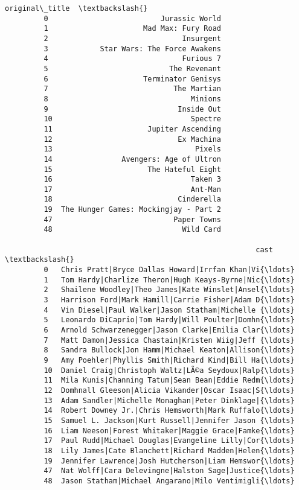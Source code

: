 \documentclass[11pt]{article}
\begin{document}
\begin{Verbatim}[commandchars=\\\{\}]
                                    original\_title  \textbackslash{}
         0                          Jurassic World   
         1                      Mad Max: Fury Road   
         2                               Insurgent   
         3            Star Wars: The Force Awakens   
         4                               Furious 7   
         5                            The Revenant   
         6                      Terminator Genisys   
         7                             The Martian   
         8                                 Minions   
         9                              Inside Out   
         10                                Spectre   
         11                      Jupiter Ascending   
         12                             Ex Machina   
         13                                 Pixels   
         14                Avengers: Age of Ultron   
         15                      The Hateful Eight   
         16                                Taken 3   
         17                                Ant-Man   
         18                             Cinderella   
         19  The Hunger Games: Mockingjay - Part 2   
         47                            Paper Towns   
         48                              Wild Card   
         
                                                          cast  \textbackslash{}
         0   Chris Pratt|Bryce Dallas Howard|Irrfan Khan|Vi{\ldots}   
         1   Tom Hardy|Charlize Theron|Hugh Keays-Byrne|Nic{\ldots}   
         2   Shailene Woodley|Theo James|Kate Winslet|Ansel{\ldots}   
         3   Harrison Ford|Mark Hamill|Carrie Fisher|Adam D{\ldots}   
         4   Vin Diesel|Paul Walker|Jason Statham|Michelle {\ldots}   
         5   Leonardo DiCaprio|Tom Hardy|Will Poulter|Domhn{\ldots}   
         6   Arnold Schwarzenegger|Jason Clarke|Emilia Clar{\ldots}   
         7   Matt Damon|Jessica Chastain|Kristen Wiig|Jeff {\ldots}   
         8   Sandra Bullock|Jon Hamm|Michael Keaton|Allison{\ldots}   
         9   Amy Poehler|Phyllis Smith|Richard Kind|Bill Ha{\ldots}   
         10  Daniel Craig|Christoph Waltz|LÃ©a Seydoux|Ralp{\ldots}   
         11  Mila Kunis|Channing Tatum|Sean Bean|Eddie Redm{\ldots}   
         12  Domhnall Gleeson|Alicia Vikander|Oscar Isaac|S{\ldots}   
         13  Adam Sandler|Michelle Monaghan|Peter Dinklage|{\ldots}   
         14  Robert Downey Jr.|Chris Hemsworth|Mark Ruffalo{\ldots}   
         15  Samuel L. Jackson|Kurt Russell|Jennifer Jason {\ldots}   
         16  Liam Neeson|Forest Whitaker|Maggie Grace|Famke{\ldots}   
         17  Paul Rudd|Michael Douglas|Evangeline Lilly|Cor{\ldots}   
         18  Lily James|Cate Blanchett|Richard Madden|Helen{\ldots}   
         19  Jennifer Lawrence|Josh Hutcherson|Liam Hemswor{\ldots}   
         47  Nat Wolff|Cara Delevingne|Halston Sage|Justice{\ldots}   
         48  Jason Statham|Michael Angarano|Milo Ventimigli{\ldots}   
         

\end{Verbatim}
\end{document}
